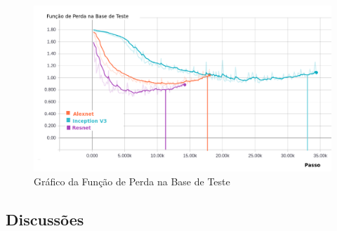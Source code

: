 \begin{figure}
\centering
\includegraphics[scale=0.5]{figuras/loss-val.png}
\caption{Gráfico da Função de Perda na Base de Teste}
\label{fig:loss-val}
\end{figure}


\subsection{Discussões}

